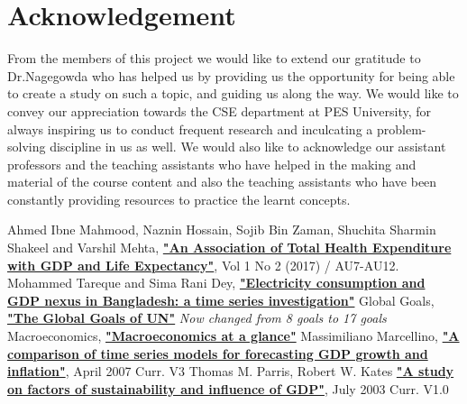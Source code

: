 \documentclass[conference]{IEEEtran}
\begin{document}
\section{Acknowledgement}
From the members of this project we would like to extend our gratitude to Dr.Nagegowda who has helped us by providing us the opportunity for being able to create a study on such a topic, and guiding us along the way.
We would like to convey our appreciation towards the CSE department at PES University, for always inspiring us to conduct frequent research and inculcating a problem-solving discipline in us as well.
We would also like to acknowledge our assistant professors and the teaching assistants who have helped in the making and material of the course content and also the teaching assistants who have been constantly providing resources to practice the learnt concepts.
\begin{thebibliography}{00}
     Ahmed Ibne Mahmood, Naznin Hossain, Sojib Bin Zaman,  Shuchita Sharmin Shakeel and Varshil Mehta,  \textbf{\href{https://jmrionline.com/jmri/article/view/72/86}{"An Association of Total Health Expenditure with GDP and Life Expectancy"}}, Vol 1 No 2 (2017) / AU7-AU12.
     Mohammed Tareque and Sima Rani Dey, \textbf{\href{https://www.emerald.com/insight/content/doi/10.1108/JABES-04-2019-0029/full/pdf}{"Electricity consumption and GDP nexus in Bangladesh: a time series investigation"}}
     Global Goals, \textbf{\href{https://www.globalgoals.org/goals/}{"The Global Goals of UN"}} \emph{Now changed from 8 goals to 17 goals}
     Macroeconomics, \textbf{\href{https://www.worldbank.org/en/topic/macroeconomics/overview}{"Macroeconomics at a glance"}}
     Massimiliano Marcellino, \textbf{\href{https://www.researchgate.net/profile/Niels-Haldrup/publication/228650389_A_comparison_of_time_series_models_for_forecasting_GDP_growth_and_inflation/links/0c96051b6b0d0e7951000000/A-comparison-of-time-series-models-for-forecasting-GDP-growth-and-inflation.pdf}{"A comparison of time series models for forecasting GDP growth and inflation"}}, April 2007 Curr. V3
     Thomas M. Parris, Robert W. Kates \textbf{\href{http://www.earthedintl.org/CourseMatls/IEIG/Readings/2b.Characterizing_Measuring_SustDev.pdf}{"A study on factors of sustainability and influence of GDP"}}, July 2003 Curr. V1.0
\end{thebibliography}
\end{document}
